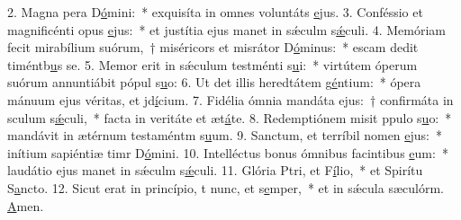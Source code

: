 2. Magna pera D\uline{ó}mini:~* exquisíta in omnes voluntáts \uline{e}jus.
3. Conféssio et magnificénti opus \uline{e}jus:~* et justítia ejus manet in sǽculm s\uline{ǽ}culi.
4. Memóriam fecit mirabílium suórum,~† miséricors et misrátor D\uline{ó}minus:~* escam dedit timéntb\uline{u}s se.
5. Memor erit in sǽculum testménti s\uline{u}i:~* virtútem óperum suórum annuntiábit pópul s\uline{u}o:
6. Ut det illis heredtátem g\uline{é}ntium:~* ópera mánuum ejus véritas, et jd\uline{í}cium.
7. Fidélia ómnia mandáta ejus:~† confirmáta in sculum s\uline{ǽ}culi,~* facta in veritáte et æt\uline{á}te.
8. Redemptiónem misit ppulo s\uline{u}o:~* mandávit in ætérnum testaméntm s\uline{u}um.
9. Sanctum, et terríbil nomen \uline{e}jus:~* inítium sapiéntiæ timr D\uline{ó}mini.
10. Intelléctus bonus ómnibus facintibus \uline{e}um:~* laudátio ejus manet in sǽculm s\uline{ǽ}culi.
11. Glória Ptri, et F\uline{í}lio,~* et Spirítu S\uline{a}ncto.
12. Sicut erat in princípio, t nunc, et s\uline{e}mper,~* et in sǽcula sæculórm. \uline{A}men.
